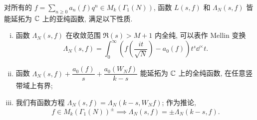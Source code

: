 \begin{theorem}[E.\ Hecke]\label{prop:L-fcn-eq}
	对所有的 $f = \sum_{n \geq 0} a_n(f) q^n \in M_k(\Gamma_1(N))$, 函数 $L(s,f)$ 和 $\Lambda_N(s,f)$ 皆能延拓为 $\mathbb{C}$ 上的亚纯函数, 满足以下性质.
	\begin{enumerate}[(i)]
		\item 函数 $\Lambda_N(s,f)$ 在收敛范围 $\Re(s) > M+1$ 内全纯, 可以表作 Mellin 变换
			\begin{equation*}
				\Lambda_N(s,f) = \int_0^\infty \left(  f\left(\frac{it}{\sqrt{N}}\right) - a_0(f) \right) t^s \dd^\times t.
			\end{equation*}
		\item 函数 $\Lambda_N(s, f) + \dfrac{a_0(f)}{s} + \dfrac{a_0(W_N f)}{k-s}$ 能延拓为 $\mathbb{C}$ 上的全纯函数, 在任意竖带域上有界;
		\item 我们有函数方程 $\Lambda_N(s, f) = \Lambda_N(k-s, W_N f)$; 作为推论,
		\begin{equation*}
			f \in M_k(\Gamma_1(N))^\pm \implies \Lambda_N(s,f) = \pm \Lambda_N(k-s, f).
		\end{equation*}
	\end{enumerate}
\end{theorem}
